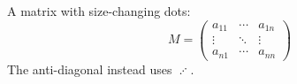 \documentclass{article}
\begin{document}
A matrix with size-changing dots:
\[
M = \left(
\begin{array}{ccc}
a_{11} & \cdots & a_{1n} \\
\vdots & \ddots & \vdots \\
a_{n1} & \cdots & a_{nn}
\end{array}
\right)
\]
The anti-diagonal instead uses $\iddots$.
\end{document}
